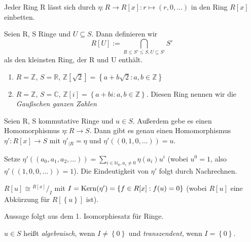 \documentclass[10pt]{scrbook}
\begin{document}
\begin{Le}
Jeder Ring R lässt sich durch $\eta: R\rightarrow R[x]: r\mapsto (r, 0, \ldots)$ in den Ring $R[x]$ einbetten.
\end{Le}

\begin{Def}
Seien R, S Ringe und $U\subseteq S$. Dann definieren wir
\begin{displaymath}
	R[U]:=\bigcap\limits_{R\leq S'\leq S, U\subseteq S'}{S'}
\end{displaymath}
als den kleinsten Ring, der R und U enthält.
\end{Def}

\begin{Bsp}
\begin{enumerate}
	\item $R=\mathbb{Z}$, $S=\mathbb{R}$, $\mathbb{Z}[\sqrt{2}]=\left\{a+b\sqrt{2}: a, b\in \mathbb{Z}\right\}$
	\item $R=\mathbb{Z}$, $S=\mathbb{C}$, $\mathbb{Z}[i]=\left\{a+b i: a, b\in \mathbb{Z}\right\}$. Diesen Ring nennen wir die \emph{Gaußschen ganzen Zahlen}
\end{enumerate}
\end{Bsp}

\begin{Sa}
Seien R, S kommutative Ringe und $u\in S$. Außerdem gebe es einen Homomorphismus $\eta: R\rightarrow S$. Dann gibt es genau einen Homomorphismus $\eta': R[x]\rightarrow S$ mit $\eta'_{|R}=\eta$ und $\eta'((0,1,0,\ldots))=u$.\label{sa:11_3}
\end{Sa}
\begin{bew}
Setze $\eta'((a_0, a_1, a_2,\ldots))=\sum_{i\in\mathbb{N}_0, a_i\neq 0}{\eta(a_i) u^i}$ (wobei $u^0=1$, also $\eta'((1, 0, 0,\ldots))=1$). Die Eindeutigkeit von $\eta'$ folgt durch Nachrechnen.
\end{bew}

\begin{Sa}
$R[u]\cong {}^{R[x]}/_I$ mit $I=\operatorname{Kern} (\eta')=\left\{f\in R[x]: f(u)=0\right\}$ (wobei $R[u]$ eine Abkürzung für $R[\left\{u\right\}]$ ist).\label{sa:11_5}
\end{Sa}
\begin{bew}
Aussage folgt aus dem 1. Isomorphiesatz für Ringe.
\end{bew}

\begin{Def}
$u\in S$ heißt \emph{algebraisch}, wenn $I\neq \left\{0\right\}$ und \emph{transzendent}, wenn $I=\left\{0\right\}$.
\end{Def}
\end{document}
